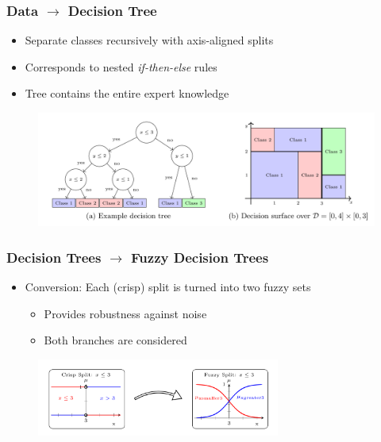\documentclass[
	10pt,
	t		%
]{beamer}
\begin{document}
\begin{frame}
	\frametitle{Data $\rightarrow$ Decision Tree}
	
	\begin{itemize}
		\item Separate classes recursively with axis-aligned splits
		\item Corresponds to nested \textit{if-then-else} rules
		\item Tree contains the entire expert knowledge
	\end{itemize}
	
	\vspace{0.2cm}
	
	\begin{figure}
		\centering
		\includegraphics[width=1\textwidth]{figures/decision-tree.png}
	\end{figure}
	
\end{frame}

\begin{frame}
	\frametitle{Decision Trees $\rightarrow$ Fuzzy Decision Trees}
	
	\begin{itemize}
		\item Conversion: Each (crisp) split is turned into two fuzzy sets
		      \begin{itemize}
			      \item Provides robustness against noise
			      \item Both branches are considered
		      \end{itemize}
	\end{itemize}
	
	\begin{figure}
		\centering
		\includegraphics[width=8cm]{figures/leaf-conversion.png}
	\end{figure}
	
\end{frame}
\end{document}
